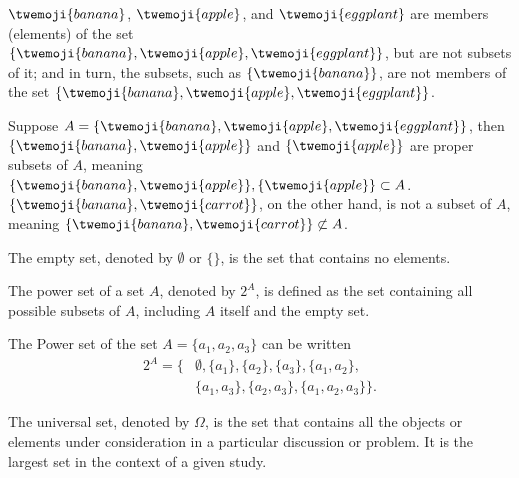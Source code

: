 \begin{example}
	$\twemoji{banana}$, $\twemoji{apple}$, and $\twemoji{eggplant}$ are members (elements) of the set $\{\twemoji{banana}, \twemoji{apple}, \twemoji{eggplant}\}$, but are not subsets of it; and in turn, the subsets, such as $\{\twemoji{banana}\}$, are not members of the set $\{\twemoji{banana}, \twemoji{apple}, \twemoji{eggplant}\}$.
\end{example}

\begin{example}
	Suppose $A = \{\twemoji{banana}, \twemoji{apple}, \twemoji{eggplant}\}$, then $\{\twemoji{banana}, \twemoji{apple}\}$ and $\{\twemoji{apple}\}$ are proper subsets of $A$, meaning $\{\twemoji{banana}, \twemoji{apple}\},\{\twemoji{apple}\}\subset  A$. $\{\twemoji{banana}, \twemoji{carrot}\}$, on the other hand, is not a subset of $A$, meaning $\{\twemoji{banana}, \twemoji{carrot}\}\not\subset  A$.
\end{example}

\begin{definition}
	The empty set, denoted by $\emptyset$ or $\{\}$, is the set that contains no elements.
\end{definition}

\begin{definition}
	\label{def:power_set}
	The power set of a set $A$, denoted by $2^A$, is defined as the set containing all possible subsets of $A$, including $A$ itself and the empty set.
\end{definition}

\begin{example}
	The Power set of the set $A = \{a_1,a_2,a_3\}$ can be written
	\begin{equation}
		\begin{split}
			2^A = \{&\emptyset, \{a_1\}, \{a_2\}, \{a_3\}, \{a_1, a_2\},\\
			& \{a_1, a_3\}, \{a_2, a_3\}, \{a_1, a_2, a_3\}\}.
		\end{split}
	\end{equation}
\end{example}

\begin{definition}
	The universal set, denoted by $\Omega$, is the set that contains all the objects or elements under consideration in a particular discussion or problem. It is the largest set in the context of a given study.
\end{definition}

